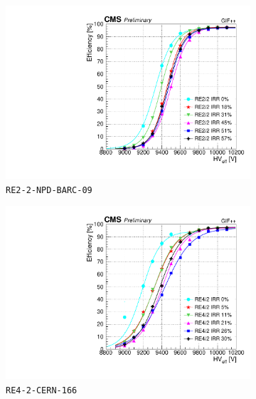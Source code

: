 	\begin{figure}[H]
    	\begin{subfigure}{0.5\linewidth}
			\centering
    		\includegraphics[width = \linewidth]{fig/chapt5/600-efficiency_vs_HV_RE2_2.pdf}
        	\caption{\label{fig:GIFpp_eff_vs_HV_600:A} \texttt{RE2-2-NPD-BARC-09}}
    	\end{subfigure}
    	\begin{subfigure}{0.5\linewidth}
			\centering
    		\includegraphics[width = \linewidth]{fig/chapt5/600-efficiency_vs_HV_RE4_2.pdf}
        	\caption{\label{fig:GIFpp_eff_vs_HV_600:B} \texttt{RE4-2-CERN-166}}
    	\end{subfigure}
    	\begin{subfigure}{0.5\linewidth}
			\centering

\end{subfigure}
\end{figure}
